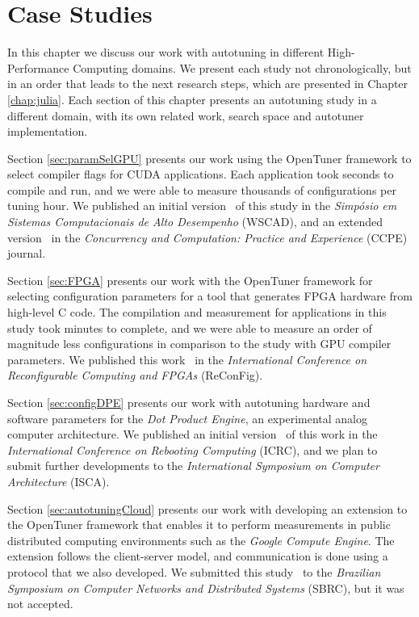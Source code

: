 \chapter{Case Studies}
\label{chap:usecases}

In this chapter we discuss our work with autotuning in different
High-Performance Computing domains. We present each study not chronologically,
but in an order that leads to the next research steps, which are presented in
Chapter \ref{chap:julia}. Each section of this chapter presents an autotuning
study in a different domain, with its own related work, search space and
autotuner implementation.

Section \ref{sec:paramSelGPU} presents our work using the OpenTuner framework
to select compiler flags for CUDA applications. Each application took seconds
to compile and run, and we were able to measure thousands of configurations per
tuning hour. We published an initial version~\cite{bruel2015autotuningGPU} of
this study in the \textit{Simpósio em Sistemas Computacionais de Alto
Desempenho} (WSCAD), and an extended version~\cite{bruel2017autotuning} in the
\textit{Concurrency and Computation: Practice and Experience} (CCPE) journal.

Section \ref{sec:FPGA} presents our work with the OpenTuner framework for
selecting configuration parameters for a tool that generates FPGA hardware from
high-level C code. The compilation and measurement for applications in this
study took minutes to complete, and we were able to measure an order of
magnitude less configurations in comparison to the study with GPU compiler
parameters. We published this work~\cite{} in the \textit{International
Conference on Reconfigurable Computing and FPGAs} (ReConFig).

Section \ref{sec:configDPE} presents our work with autotuning hardware and
software parameters for the \textit{Dot Product Engine}, an experimental analog
computer architecture. We published an initial version~\cite{} of this work in
the \textit{International Conference on Rebooting Computing} (ICRC), and we
plan to submit further developments to the \textit{International Symposium on
Computer Architecture} (ISCA).  

Section \ref{sec:autotuningCloud} presents our work with developing an
extension to the OpenTuner framework that enables it to perform measurements in
public distributed computing environments such as the \textit{Google Compute
Engine}. The extension follows the client-server model, and communication is
done using a protocol that we also developed. We submitted this
study~\cite{bruel2016new} to the \textit{Brazilian Symposium on Computer
Networks and Distributed Systems} (SBRC), but it was not accepted.
